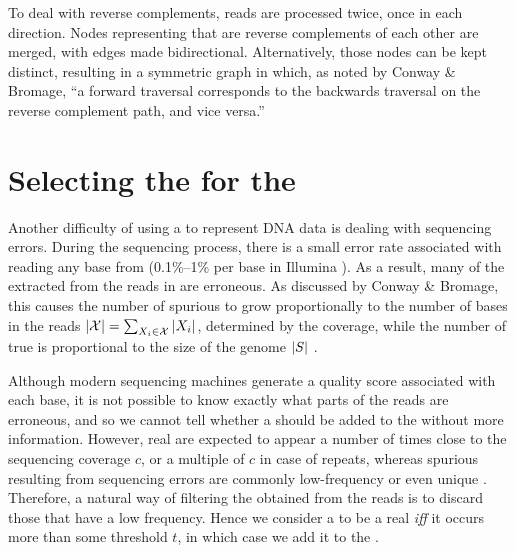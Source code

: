 To deal with reverse complements, reads are processed twice, once in each direction. Nodes representing  that are reverse complements of each other are merged, with edges made bidirectional. Alternatively, those nodes can be kept distinct, resulting in a symmetric graph in which, as noted by Conway \& Bromage, ``a forward traversal corresponds to the backwards traversal on the reverse complement path, and vice versa.'' \cite{Conway2011}

\section{Selecting the  for the \dBG}
\label{subsec:dBG-selectingkmers}

Another difficulty of using a \dBG to represent DNA data is dealing with sequencing errors. During the sequencing process, there is a small error rate associated with reading any base from  (0.1\%--1\% per base in Illumina \cite{Metzker2010}). As a result, many of the  extracted from the reads in \readset are erroneous. As discussed by Conway \& Bromage, this causes the number of spurious  to grow proportionally to the number of bases in the reads $|\readset|=\sum_{\strname{X}_i \in \readset} |\strname{X}_i|$, determined by the coverage, while the number of true  is proportional to the size of the genome $|\strname{S}|$ \cite{Conway2011}.

Although modern sequencing machines generate a quality score associated with each base, it is not possible to know exactly what parts of the reads are erroneous, and so we cannot tell whether a \kmer should be added to the \dBG without more information. However, real  are expected to appear a number of times close to the sequencing coverage $c$, or a multiple of $c$ in case of repeats, whereas spurious  resulting from sequencing errors are commonly low-frequency or even unique \cite{Conway2011, Zhang2014, Ghosh2019}. Therefore, a natural way of filtering the  obtained from the reads is to discard those that have a low frequency. Hence we consider a \kmer to be a real \kmer \emph{iff} it occurs more than some threshold $t$, in which case we add it to the \dBG.

